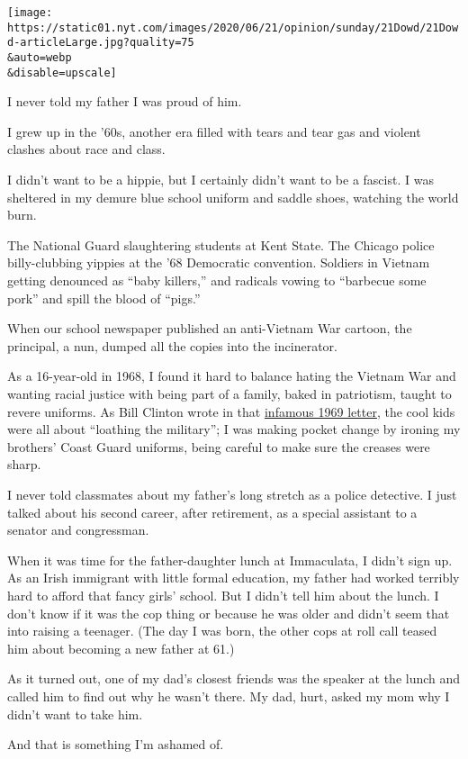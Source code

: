 \texttt{[image: https://static01.nyt.com/images/2020/06/21/opinion/sunday/21Dowd/21Dowd-articleLarge.jpg?quality=75\\\&auto=webp\\\&disable=upscale]}

I never told my father I was proud of him.

I grew up in the '60s, another era filled with tears and tear gas and
violent clashes about race and class.

I didn't want to be a hippie, but I certainly didn't want to be a
fascist. I was sheltered in my demure blue school uniform and saddle
shoes, watching the world burn.

The National Guard slaughtering students at Kent State. The Chicago
police billy-clubbing yippies at the '68 Democratic convention. Soldiers
in Vietnam getting denounced as ``baby killers,'' and radicals vowing to
``barbecue some pork'' and spill the blood of ``pigs.''

When our school newspaper published an anti-Vietnam War cartoon, the
principal, a nun, dumped all the copies into the incinerator.

As a 16-year-old in 1968, I found it hard to balance hating the Vietnam
War and wanting racial justice with being part of a family, baked in
patriotism, taught to revere uniforms. As Bill Clinton wrote in that
\href{https://www.pbs.org/wgbh/pages/frontline/shows/clinton/etc/draftletter.html}{infamous
1969 letter}, the cool kids were all about ``loathing the military''; I
was making pocket change by ironing my brothers' Coast Guard uniforms,
being careful to make sure the creases were sharp.

I never told classmates about my father's long stretch as a police
detective. I just talked about his second career, after retirement, as a
special assistant to a senator and congressman.

When it was time for the father-daughter lunch at Immaculata, I didn't
sign up. As an Irish immigrant with little formal education, my father
had worked terribly hard to afford that fancy girls' school. But I
didn't tell him about the lunch. I don't know if it was the cop thing or
because he was older and didn't seem that into raising a teenager. (The
day I was born, the other cops at roll call teased him about becoming a
new father at 61.)

As it turned out, one of my dad's closest friends was the speaker at the
lunch and called him to find out why he wasn't there. My dad, hurt,
asked my mom why I didn't want to take him.

And that is something I'm ashamed of.

